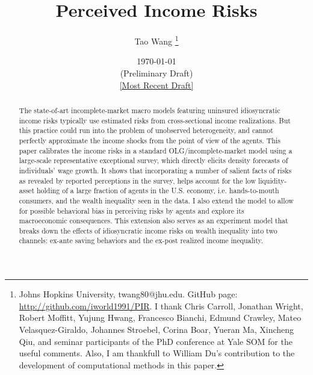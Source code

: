 \begin{titlepage}
 \title{Perceived Income Risks}
 
 \author{Tao Wang \thanks{Johns Hopkins University, twang80@jhu.edu. GitHub page: \url{http://github.com/iworld1991/PIR}. I thank Chris Carroll, Jonathan Wright, Robert Moffitt, Yujung Hwang, Francesco Bianchi, Edmund Crawley, Mateo Velasquez-Giraldo, Johannes Stroebel, Corina Boar, Yueran Ma, Xincheng Qiu, and seminar participants of the PhD conference at Yale SOM for the useful comments. Also, I am thankfull to William Du's contribution to the development of computational methods in this paper.}}

\date{\today \\(Preliminary Draft) \\\href{https://github.com/iworld1991/PIR/blob/master/PIR.pdf}{[Most Recent Draft]}}
	\maketitle
	\begin{abstract}
	\begin{singlespace}
		\noindent The state-of-art incomplete-market macro models featuring uninsured idiosyncratic income risks typically use estimated risks from cross-sectional income realizations. But this practice could run into the problem of unobserved heterogeneity, and cannot perfectly approximate the income shocks from the point of view of the agents. This paper calibrates the income risks in a standard OLG/incomplete-market model using a large-scale representative exceptional survey, which directly elicits density forecasts of individuals' wage growth. It shows that incorporating a number of salient facts of risks as revealed by reported perceptions in the survey, helps account for the low liquidity-asset holding of a large fraction of agents in the U.S. economy, i.e. hands-to-mouth consumers, and the wealth inequality seen in the data. I also extend the model to allow for possible behavioral bias in perceiving risks by agents and explore its macroeconomic consequences. This extension also serves as an experiment model that breaks down the effects of idiosyncratic income risks on wealth inequality into two channels: ex-ante saving behaviors and the ex-post realized income inequality.
		

\end{singlespace}
\end{abstract}
\end{titlepage}

